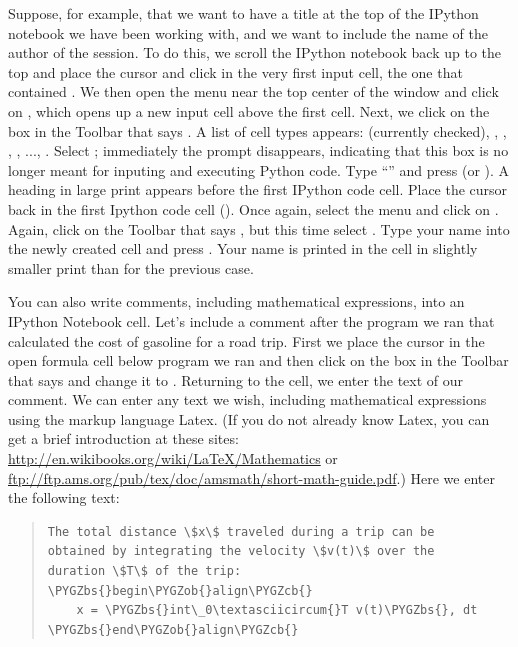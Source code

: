 \documentclass[letterpaper,10pt,english]{sphinxmanual}
\def\PYGZbs{\char`\\}
\def\PYGZob{\char`\{}
\def\PYGZcb{\char`\}}
\begin{document}
Suppose, for example, that we want to have a title at the top of the IPython notebook we have been working with, and we want to include the name of the author of the session.  To do this, we scroll the IPython notebook back up to the top and place the cursor and click in the very first input cell, the one that contained .  We then open the  menu near the top center of the window and click on , which opens up a new input cell above the first cell.  Next, we click on the box in the Toolbar that says .  A list of cell types appears:  (currently checked), , , , , ..., .  Select ; immediately the  prompt disappears, indicating that this box is no longer meant for inputing and executing Python code.  Type ``'' and press  (or ).  A heading in large print appears before the first IPython code cell.  Place the cursor back in the first Ipython code cell ().  Once again, select the  menu and click on .  Again, click on the Toolbar that says , but this time select .  Type your name into the newly created cell and press .  Your name is printed in the cell in slightly smaller print than for the previous case.

You can also write comments, including mathematical expressions, into an IPython Notebook cell.  Let's include a comment after the program we ran that calculated the cost of gasoline for a road trip.  First we place the cursor in the open formula cell below program we ran and then click on the box in the Toolbar that says  and change it to .  Returning to the cell, we enter the text of our comment.  We can enter any text we wish, including mathematical expressions using the markup language Latex.  (If you do not already know Latex, you can get a brief introduction at these sites: \href{http://en.wikibooks.org/wiki/LaTeX/Mathematics}{http://en.wikibooks.org/wiki/LaTeX/Mathematics} or \href{ftp://ftp.ams.org/pub/tex/doc/amsmath/short-math-guide.pdf}{ftp://ftp.ams.org/pub/tex/doc/amsmath/short-math-guide.pdf}.)  Here we enter the following text:
\begin{quote}

\begin{Verbatim}[commandchars=\\\{\}]
The total distance \$x\$ traveled during a trip can be
obtained by integrating the velocity \$v(t)\$ over the
duration \$T\$ of the trip:
\PYGZbs{}begin\PYGZob{}align\PYGZcb{}
    x = \PYGZbs{}int\_0\textasciicircum{}T v(t)\PYGZbs{}, dt
\PYGZbs{}end\PYGZob{}align\PYGZcb{}
\end{Verbatim}
\end{quote}
\end{document}
